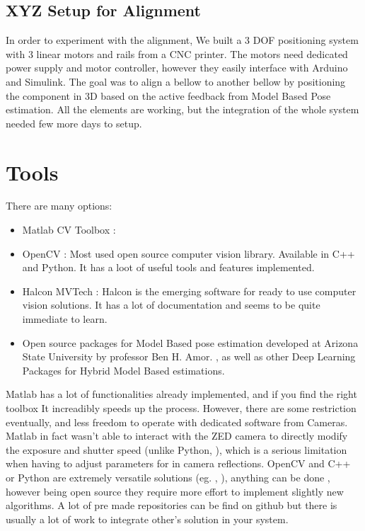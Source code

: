 \documentclass[12pt,a4paper]{article}
\begin{document}
\subsection{XYZ Setup for Alignment}
In order to experiment with the alignment, We built a 3 DOF positioning system with 3 linear motors and rails from a CNC printer. The motors need dedicated power supply and motor controller, however they easily interface with Arduino and Simulink. The goal was to align a bellow to another bellow by positioning the component in 3D based on the active feedback from Model Based Pose estimation. All the elements are working, but the integration of the whole system needed few more days to setup.
\section{Tools}
There are many options: 
\begin{itemize}
    \item Matlab CV Toolbox : 
    \item OpenCV : Most used open source computer vision library. Available in C++ and Python. It has a loot of useful tools and features implemented. 
    \item Halcon MVTech : Halcon is the emerging software for ready to use computer vision solutions. It has a lot of documentation and seems to be quite immediate to learn. 
    \item Open source packages for Model Based pose estimation developed at Arizona State University by professor Ben H. Amor. , as well as other Deep Learning Packages for Hybrid Model Based estimations.
\end{itemize}
Matlab has a lot of functionalities already implemented, and if you find the right toolbox It increadibly speeds up the process. However, there are some restriction eventually, and less freedom to operate with dedicated software from Cameras. Matlab in fact wasn't able to interact with the ZED camera to directly modify the exposure and shutter speed (unlike Python, \cite{noauthor_zed-python-api/tutorials_nodate}
), which is a serious limitation when having to adjust parameters for in camera reflections. OpenCV and C++ or Python are extremely versatile solutions (eg. \cite{slr_camera_Python}, \cite{out-sider_cheap_2018}
), anything can be done , however being open source they require more effort to implement slightly new algorithms. A lot of pre made repositories can be find on github but there is usually a lot of work to integrate other's solution in your system. 
\end{document}
